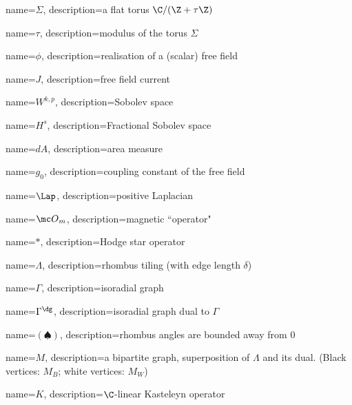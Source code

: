
	{name={\ensuremath{\Sigma}}, 
	description={a flat torus $\C/(\Z+\tau\Z)$}
}

	{name={\ensuremath{\tau}}, 
	description={modulus of the torus $\Sigma$}
}

	{name={\ensuremath{\phi}}, 
	description={realisation of a (scalar) free field}
}

	{name={\ensuremath{J}}, 
	description={free field current}
}


	{name={\ensuremath{W^{k,p}}}, 
	description={Sobolev space}
}


	{name={\ensuremath{H^s}}, 
	description={Fractional Sobolev space}
}


	{name={\ensuremath{dA}}, 
	description={area measure}
}

	{name={\ensuremath{g_0}}, 
	description={coupling constant of the free field}
}

	{name={\ensuremath{\Lap}}, 
	description={positive Laplacian}
}

	{name={\ensuremath{{\mc O}_m}}, 
	description={magnetic ``operator"}
}

	{name={\ensuremath{\ast}}, 
	description={Hodge star operator}
}



	{name={\ensuremath{\Lambda}}, 
	description={rhombus tiling (with edge length $\delta$)}
}

	{name={\ensuremath{\Gamma}}, 
	description={isoradial graph}
}

	{name={\ensuremath{\Gamma^\dg}}, 
	description={isoradial graph dual to $\Gamma$}
}

	{name={\ensuremath{(\spadesuit)}}, 
	description={rhombus angles are bounded away from 0}
}

	{name={\ensuremath{M}}, 
	description={a bipartite graph, superposition of $\Lambda$ and its dual. (Black vertices: $M_B$; white vertices: $M_W$)}
}

	{name={\ensuremath{K}}, 
	description={$\C$-linear Kasteleyn operator}
}

